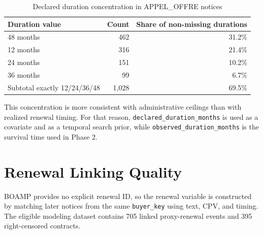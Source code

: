 \documentclass[11pt,a4paper]{article}
\begin{document}
\begin{table}[H]
\centering
\caption{Declared duration concentration in APPEL\_OFFRE notices}
\small
\begin{tabular}{lrr}
\toprule
Duration value & Count & Share of non-missing durations \\
\midrule
48 months & 462 & 31.2\% \\
12 months & 316 & 21.4\% \\
24 months & 151 & 10.2\% \\
36 months & 99 & 6.7\% \\
Subtotal exactly 12/24/36/48 & 1{,}028 & 69.5\% \\
\bottomrule
\end{tabular}
\end{table}

This concentration is more consistent with administrative ceilings than with
realized renewal timing. For that reason, \texttt{declared\_duration\_months}
is used as a covariate and as a temporal search prior, while
\texttt{observed\_duration\_months} is the survival time used in Phase 2.

\section{Renewal Linking Quality}

BOAMP provides no explicit renewal ID, so the renewal variable is constructed by
matching later notices from the same \texttt{buyer\_key} using text, CPV, and
timing. The eligible modeling dataset contains 705 linked proxy-renewal events
and 395 right-censored contracts.
\end{document}
